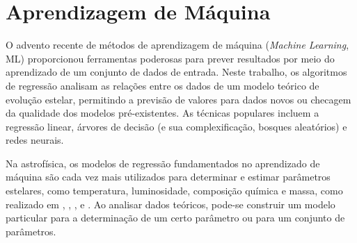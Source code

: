     
    \section{Aprendizagem de Máquina}
        O advento recente de métodos de aprendizagem de máquina (\textit{Machine Learning}, ML) proporcionou ferramentas poderosas para prever resultados por meio do aprendizado de um conjunto de dados de entrada. Neste trabalho, os algoritmos de regressão analisam as relações entre os dados de um modelo teórico de evolução estelar, permitindo a previsão de valores para dados novos ou checagem da qualidade dos modelos pré-existentes. As técnicas populares incluem a regressão linear, árvores de decisão (e sua complexificação, bosques aleatórios) e redes neurais.  
        
        Na astrofísica, os modelos de regressão fundamentados no aprendizado de máquina são cada vez mais utilizados para determinar e estimar parâmetros estelares, como temperatura, luminosidade, composição química e massa, como realizado em  , ,
        ,   e . Ao analisar dados teóricos, pode-se construir um modelo particular para a determinação de um certo parâmetro ou para um conjunto de parâmetros.
    
